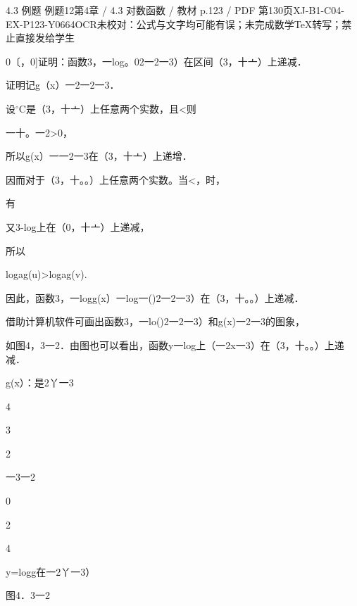\begin{bankitem}{4.3 例题 例题12}{第4章 / 4.3 对数函数 / 教材 p.123 / PDF 第130页}{XJ-B1-C04-EX-P123-Y0664}{OCR未校对：公式与文字均可能有误；未完成数学TeX转写；禁止直接发给学生}
\begin{ocrdraft}
\par
0〔，0]证明：函数3，一log。02一2一3）在区间（3，十亠）上递减．
\par
证明记g（x）一2一2一3．
\par
设\ensuremath{{}^\circ\mathrm C}是（3，十亠）上任意两个实数，且<则
\par
一十。一2>0，
\par
所以g(x）一一2一3在（3，十亠）上递增．
\par
因而对于（3，十。。）上任意两个实数。当<，时，
\par
有
\par
又3-log上在（0，十亠）上递减，
\par
所以
\par
logag(u)>logag(v).
\par
因此，函数3，一logg(x）一log一()2一2一3）在（3，十。。）上递减．
\par
借助计算机软件可画出函数3，一lo()2一2一3）和g(x)一2一3的图象，
\par
如图4，3一2．由图也可以看出，函数y一log上（一2x一3）在（3，十。。）上递减．
\par
g(x）：是2丫一3
\par
4
\par
3
\par
2
\par
一3一2
\par
0
\par
2
\par
4
\par
y=logg在一2丫一3）
\par
图4．3一2
\end{ocrdraft}
\end{bankitem}

